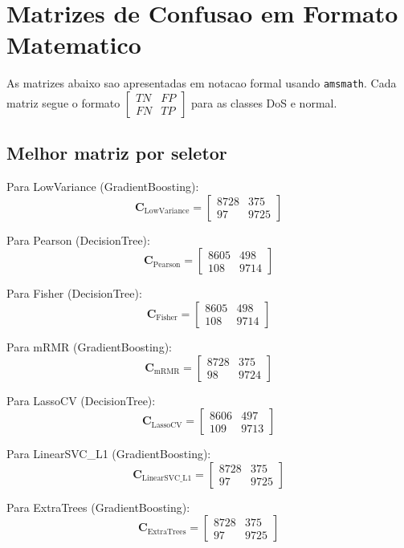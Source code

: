 \documentclass[12pt,a4paper]{article}
\begin{document}
\section{Matrizes de Confusao em Formato Matematico}

As matrizes abaixo sao apresentadas em notacao formal usando \texttt{amsmath}. Cada matriz segue o formato $\begin{bmatrix}TN & FP \\ FN & TP\end{bmatrix}$ para as classes DoS e normal.

\subsection{Melhor matriz por seletor}

Para LowVariance (GradientBoosting):
\[
\mathbf{C}_{\text{LowVariance}} =
\begin{bmatrix}
8728 & 375 \\
97 & 9725
\end{bmatrix}
\]

Para Pearson (DecisionTree):
\[
\mathbf{C}_{\text{Pearson}} =
\begin{bmatrix}
8605 & 498 \\
108 & 9714
\end{bmatrix}
\]

Para Fisher (DecisionTree):
\[
\mathbf{C}_{\text{Fisher}} =
\begin{bmatrix}
8605 & 498 \\
108 & 9714
\end{bmatrix}
\]

Para mRMR (GradientBoosting):
\[
\mathbf{C}_{\text{mRMR}} =
\begin{bmatrix}
8728 & 375 \\
98 & 9724
\end{bmatrix}
\]

Para LassoCV (DecisionTree):
\[
\mathbf{C}_{\text{LassoCV}} =
\begin{bmatrix}
8606 & 497 \\
109 & 9713
\end{bmatrix}
\]

Para LinearSVC\_L1 (GradientBoosting):
\[
\mathbf{C}_{\text{LinearSVC\_L1}} =
\begin{bmatrix}
8728 & 375 \\
97 & 9725
\end{bmatrix}
\]

Para ExtraTrees (GradientBoosting):
\[
\mathbf{C}_{\text{ExtraTrees}} =
\begin{bmatrix}
8728 & 375 \\
97 & 9725
\end{bmatrix}
\]
\end{document}
